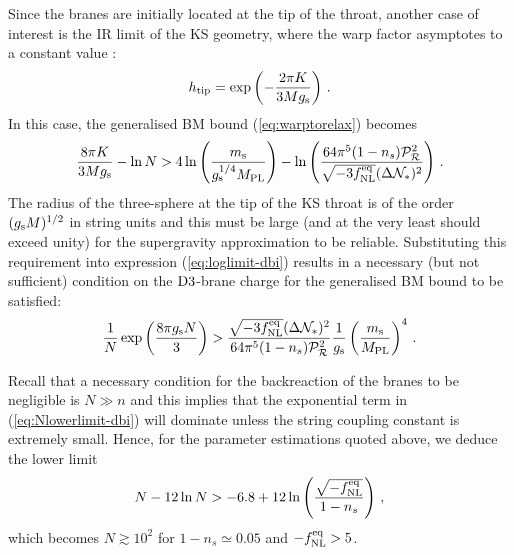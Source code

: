 Since the branes are initially located at the tip of the 
throat, another case of interest is the IR limit of the KS geometry, where 
the warp factor asymptotes to a constant value 
\cite{gkp}:
% 
\begin{equation}
\label{eq:KStip-dbi}
h_{\rm tip} = \exp \left( - \frac{2\pi K}{3Mg_\mathrm{s}} \right) \,.
\end{equation}
% 
In this case, the generalised BM bound (\ref{eq:warptorelax}) becomes
%  
\begin{equation}
\label{eq:loglimit-dbi}
\frac{8\pi K}{3Mg_\mathrm{s}} -\ln N > 4 \ln \left( \frac{m_\mathrm{s}}{g_\mathrm{s}^{1/4}M_{\mathrm{PL}}} \right)
-\ln \left( 
\frac{64\pi^5 (1-n_s)\mathcal{P}_{\mathcal{R}}^2 }{\sqrt{-3f_{\mathrm{NL}}^{\mathrm{eq}}} ( \Delta \mathcal{N}_*)^2}
\right) \,.
\end{equation}
% 
The radius of the three-sphere at the tip of the KS 
throat is of the order $(g_\mathrm{s} M)^{1/2}$ in string units 
and this must be large (and at the very least should exceed
unity) for the supergravity approximation to be reliable. 
Substituting this requirement into expression (\ref{eq:loglimit-dbi}) 
results in a necessary (but not sufficient) condition 
on the ${\rm D3}$-brane charge for the 
generalised BM bound to be satisfied:
%  
\begin{equation}
\label{eq:Nlowerlimit-dbi}
\frac{1}{N} \exp \left( \frac{8\pi g_\mathrm{s} N}{3}  \right)
> \frac{\sqrt{-3f_{\mathrm{NL}}^{\mathrm{eq}}} ( \Delta \mathcal{N}_*)^2}{64\pi^5 
(1-n_s)\mathcal{P}_{\mathcal{R}}^2 } \frac{1}{g_\mathrm{s}} \left( \frac{m_\mathrm{s}}{M_{\mathrm{PL}}} \right)^4 \,.
\end{equation}
% 


Recall that a necessary condition for the backreaction 
of the branes to be negligible is 
$N \gg n$ and this implies that the 
exponential term in (\ref{eq:Nlowerlimit-dbi}) will dominate unless 
the string coupling constant is extremely small. Hence, for 
the parameter estimations quoted above, we 
deduce the lower limit 
% 
\begin{equation}
\label{eq:Nconstraint-dbi}
N- 12 \ln N > -6.8 +12 \ln \left( \frac{\sqrt{-f_{\mathrm{NL}}^{\mathrm{eq}}}}{1-n_s} \right) \,,
\end{equation}
% 
which becomes $N \gtrsim 10^2$ for $1-n_s \simeq 0.05$ and $-f_{\mathrm{NL}}^{\mathrm{eq}}>5$.


